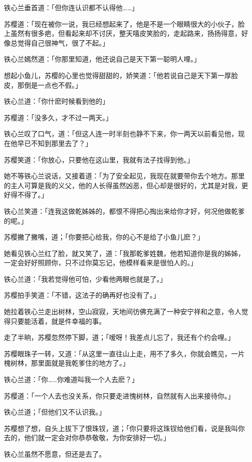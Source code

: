 \documentclass[12pt,oneside]{book}
\begin{document}
铁心兰垂首道：「但你连认识都不认得他\ldots\ldots」

苏樱道：「现在被你一说，我已经想起来了，他是不是一个眼睛很大的小伙子，脸上虽然有很多疤，但看起来却不讨厌，整天嘻皮笑脸的，走起路来，扬扬得意，好像总觉得自己很神气，很了不起。」

铁心兰嫣然道：「你那里知道，他还说自己是天下第一聪明人哩。」

想起小鱼儿，苏樱的心里也觉得甜甜的，娇笑道：「他若说自己是天下第一厚脸皮，那倒是一点也不假。」

铁心兰道：「你什麽时候看到他的」

苏樱道：「没多久，才不过一两天。」

铁心兰叹了口气，道：「但这人连一时半刻也静不下来，你一两天以前看见他，现在他早已不知到那里去了？」

苏樱笑道：「你放心，只要他在这山里，我就有法子找得到他。」

她不等铁心兰说话，又接着道：「为了安全起见，我现在就要带你去个地方。那里的主人可算是我的义父，他的人长得虽然凶恶，但心却是很好的，尤其是对我，更好得不得了。」

铁心兰笑道：「连我这做乾姊姊的，都恨不得把心掏出来给你才好，何况他做乾爹的呢。」

苏樱撇了撇嘴，道；「你要把心给我，你的心不是给了小鱼儿麽？」

她看见铁心兰红了脸，就又笑了，道：「我那乾爹姓魏，他若知道你是我的姊姊，一定会好好照顾你，只不过你莫忘记，他模样看来是很怕人的。」

铁心兰道：「我若觉得他可怕，少看他两眼也就是了。」

苏樱拍手笑道：「不错，这法子的确再好也没有了。」

她拉着铁心兰走出树林，空山寂寂，天地间彷佛充满了一种安宁祥和之意，令人觉得只要能活着，就是件幸福的事。

走了半晌，苏樱忽然停下脚，道；「嗳呀！我差点儿忘了，我还有个约会哩。」

苏樱眼珠子一转，又道：「从这里一直往山上走，用不了多久，你就会瞧见，一片槐树林，那里面就是我乾爹住的地方了。」

铁心兰道：「你\ldots\ldots 你难道叫我一个人去麽？」

苏樱道：「一个人去也没关系，你只要走进愧树林，自然就有人出来接待你。」

铁心兰道；「但他们又不认识我。」

苏樱想了想，自头上拔下了恨珠钗，道；「你只要将这珠钗给他们看，说是我叫你去的，他们就一定会对你恭恭敬敬，为你安排好一切。」

铁心兰虽然不愿意，但还是去了。
\end{document}
